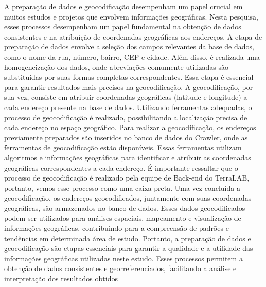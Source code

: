 A preparação de dados e geocodificação desempenham um papel crucial em muitos estudos e projetos que envolvem informações geográficas. Nesta pesquisa, esses processos desempenham um papel fundamental na obtenção de dados consistentes e na atribuição de coordenadas geográficas aos endereços.
A etapa de preparação de dados envolve a seleção dos campos relevantes da base de dados, como o nome da rua, número, bairro, CEP e cidade. Além disso, é realizada uma homogeneização dos dados, onde abreviações comumente utilizadas são substituídas por suas formas completas correspondentes. Essa etapa é essencial para garantir resultados mais precisos na geocodificação.
A geocodificação, por sua vez, consiste em atribuir coordenadas geográficas (latitude e longitude) a cada endereço presente na base de dados. Utilizando ferramentas adequadas, o processo de geocodificação é realizado, possibilitando a localização precisa de cada endereço no espaço geográfico.
Para realizar a geocodificação, os endereços previamente preparados são inseridos no banco de dados do Crawler, onde as ferramentas de geocodificação estão disponíveis. Essas ferramentas utilizam algoritmos e informações geográficas para identificar e atribuir as coordenadas geográficas correspondentes a cada endereço. É importante ressaltar que o processo de geocodificação é realizado pela equipe de Back-end do TerraLAB, portanto, vemos esse processo como uma caixa preta.
Uma vez concluída a geocodificação, os endereços geocodificados, juntamente com suas coordenadas geográficas, são armazenados no banco de dados. Esses dados geocodificados podem ser utilizados para análises espaciais, mapeamento e visualização de informações geográficas, contribuindo para a compreensão de padrões e tendências em determinada área de estudo.
Portanto, a preparação de dados e geocodificação são etapas essenciais para garantir a qualidade e a utilidade das informações geográficas utilizadas neste estudo. Esses processos permitem a obtenção de dados consistentes e georreferenciados, facilitando a análise e interpretação dos resultados obtidos
